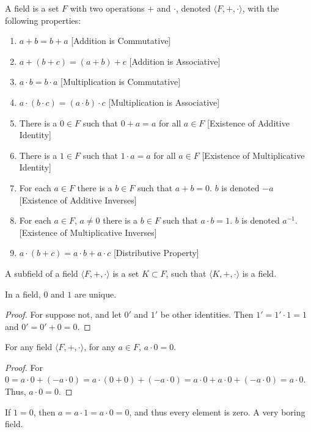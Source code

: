 \documentclass[crop=false,class=book]{standalone}
\begin{document}
\begin{definition}
A field is a set $F$ with two operations $+$ and $\cdot$, denoted $\langle F, +,\cdot \rangle$, with the following properties:
\begin{enumerate}
\item $a+b=b+a$ \hfill [Addition is Commutative]
\item $a+(b+c)=(a+b)+c$ \hfill [Addition is Associative]
\item $a\cdot b = b\cdot a$ \hfill [Multiplication is Commutative]
\item $a\cdot (b\cdot c) = (a\cdot b)\cdot c$ \hfill [Multiplication is Associative]
\item There is a $0\in F$ such that $0+a=a$ for all $a\in F$ \hfill [Existence of Additive Identity]
\item There is a $1\in F$ such that $1\cdot a = a$ for all $a\in F$ \hfill [Existence of Multiplicative Identity]
\item For each $a\in F$ there is a $b\in F$ such that $a+b = 0$. $b$ is denoted $-a$ \hfill [Existence of Additive Inverses]
\item For each $a\in F$, $a\ne 0$ there is a $b\in F$ such that $a\cdot b = 1$. $b$ is denoted $a^{-1}$. \hfill [Existence of Multiplicative Inverses]
\item $a\cdot(b+c) = a\cdot b + a\cdot c$ \hfill [Distributive Property]
\end{enumerate}
\end{definition}
\begin{definition}
A subfield of a field $\langle F,+,\cdot \rangle$ is a set $K\subset F$, such that $\langle K, +,\cdot \rangle$ is a field.
\end{definition}
\begin{theorem}
In a field, $0$ and $1$ are unique.
\end{theorem}
\begin{proof}
For suppose not, and let $0'$ and $1'$ be other identities. Then $1'=1'\cdot 1 = 1$ and $0'=0'+0=0$.
\end{proof}
\begin{theorem}
For any field $\langle F,+,\cdot \rangle$, for any $a\in F$, $a\cdot 0 = 0$.
\end{theorem}
\begin{proof}
For $0 = a\cdot 0 + (-a\cdot 0) = a\cdot(0+0) +(-a\cdot 0) = a\cdot 0 + a\cdot 0 + (-a\cdot 0) = a\cdot 0$. Thus, $a\cdot 0 = 0$.
\end{proof}
\begin{remark}
If $1=0$, then $a=a\cdot 1 = a\cdot 0 = 0$, and thus every element is zero. A very boring field.
\end{remark}
\end{document}
